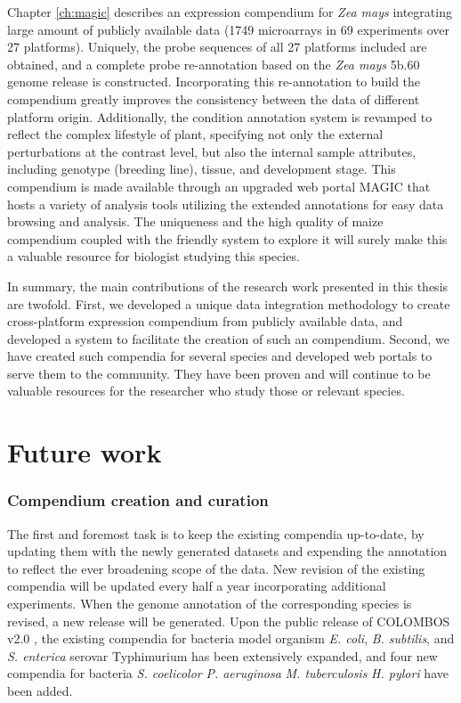 Chapter \ref{ch:magic} describes an expression compendium for \textit{Zea mays} integrating large amount of publicly available data (1749 microarrays in 69 experiments over 27 platforms).  Uniquely, the probe sequences of all 27 platforms included are obtained, and a complete probe re-annotation based on the \textit{Zea mays} 5b.60 genome release is constructed.  Incorporating this re-annotation to build the compendium greatly improves the consistency between the data of different platform origin. Additionally, the condition annotation system is revamped to reflect the complex lifestyle of plant, specifying not only the external perturbations at the contrast level, but also the internal sample attributes, including genotype (breeding line), tissue, and development stage. This compendium is made available through an upgraded web portal MAGIC that hosts a variety of analysis tools utilizing the extended annotations for easy data browsing and analysis. The uniqueness and the high quality of maize compendium coupled with the friendly system to explore it will surely make this a valuable resource for biologist studying this species.


In summary, the main contributions of the research work presented in this thesis are twofold. First, we developed a unique data integration methodology to create cross-platform expression compendium from publicly available data, and developed a system to facilitate the creation of such an compendium. Second, we have created such compendia for several species and developed web portals to serve them to the community.  They have been proven and will continue to be valuable resources for the researcher who study those or relevant species.












\section{Future work}



\subsubsection*{Compendium creation and curation}


The first and foremost task is to keep the existing compendia up-to-date, by updating them with the newly generated datasets and expending the annotation to  reflect the ever broadening scope of the data. New revision of the existing compendia will be updated every half a year incorporating additional experiments. When the genome annotation of the corresponding species is revised, a new release will be generated. Upon the public release of COLOMBOS v2.0 \cite{Meysman2014}, the existing compendia for bacteria model organism \textit{E. coli}, \textit{B. subtilis}, and \textit{S. enterica} serovar Typhimurium has been extensively expanded, and four new compendia for bacteria \textit{S. coelicolor} \textit{P. aeruginosa} \textit{M. tuberculosis} \textit{H. pylori} have been added.


